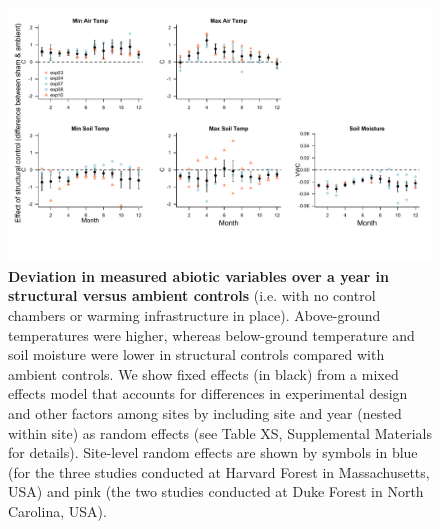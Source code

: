 \documentclass{article}
\begin{document}
 
 \begin{figure}[p]
\centering
 \includegraphics{../Analyses/figures/ShamVSAmbient_all.pdf}  
 \caption{\textbf{Deviation in measured abiotic variables over a year in structural versus ambient controls} (i.e. with no control chambers or warming infrastructure in place). Above-ground temperatures were higher, whereas below-ground temperature and soil moisture were lower in structural controls compared with ambient controls. We show fixed effects (in black) from a mixed effects model that accounts for differences in experimental design and other factors among sites by including site and year (nested within site) as random effects (see Table XS, Supplemental Materials for details). Site-level random effects are shown by symbols in blue (for the three studies conducted at Harvard Forest in Massachusetts, USA) and pink (the two studies conducted at Duke Forest in North Carolina, USA).}
 \label{fig:shamamb}
 \end{figure}
\clearpage
\end{document}
